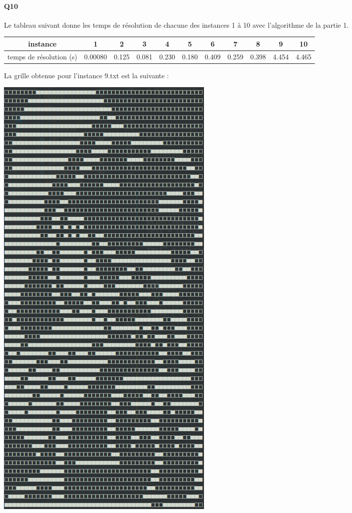 \documentclass[12pt]{article}
\begin{document}
			\paragraph{Q10}
				Le tableau suivant donne les temps de résolution de chacune des instances 1 à 10 avec l'algorithme de la partie 1.
				\begin{center}
					\begin{tabular}{|c|c|c|c|c|c|c|c|c|c|c| }
						\hline
						instance & 1 & 2 & 3 & 4 & 5 & 6 & 7 & 8 & 9 & 10 \\ \hline
						temps de résolution (s) & 0.00080 & 0.125 & 0.081 & 0.230 & 0.180 & 0.409 & 0.259 & 0.398 & 4.454 & 4.465 \\ \hline
					\end{tabular}
				\end{center}
				
				La grille obtenue pour l'instance 9.txt est la suivante :
				\begin{center}
				\includegraphics[scale=0.4]{instance9.png}
			\end{center}
		
\end{document}
